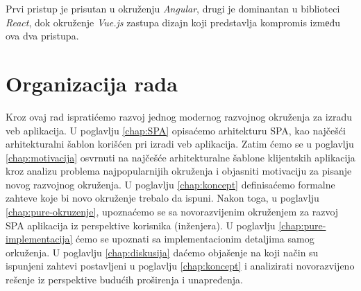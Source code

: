\documentclass[12pt,oneside]{memoir}
\begin{document}
Prvi pristup je prisutan u okruženju \emph{Angular}, drugi je dominantan u biblioteci 
\emph{React}, dok okruženje \emph{Vue.js} zastupa dizajn koji predstavlja kompromis izmеđu ova dva pristupa.
\section{Organizacija rada}
Kroz ovaj rad ispratićemo razvoj jednog modernog razvojnog okruženja za izradu 
veb aplikacija. U poglavlju \ref{chap:SPA} opisaćemo arhitekturu SPA, kao najčešći arhitekturalni šablon korišćen pri
izradi veb aplikacija. Zatim ćemo se u poglavlju \ref{chap:motivacija} osvrnuti na najčešće
arhitekturalne šablone klijentskih aplikacija kroz analizu problema najpopularnijih okruženja i objasniti motivaciju
za pisanje novog razvojnog okruženja. U poglavlju \ref{chap:koncept} definisaćemo formalne zahteve koje bi novo okruženje
trebalo da ispuni.
Nakon toga, u poglavlju \ref{chap:pure-okruzenje}, upoznaćemo se sa novorazvijenim okruženjem za razvoj SPA aplikacija iz perspektive korisnika (inženjera).
U poglavlju \ref{chap:pure-implementacija} ćemo se upoznati sa implementacionim detaljima samog orkuženja.
U poglavlju \ref{chap:diskusija} daćemo objašenje na koji način su ispunjeni zahtevi postavljeni u poglavlju \ref{chap:koncept}
i analizirati novorazvijeno rešenje iz perspektive budućih proširenja i unapređenja.






\end{document}
